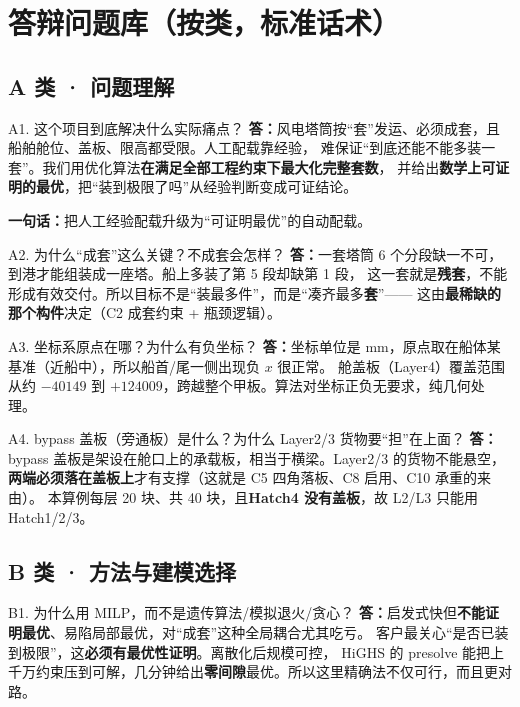 \documentclass[11pt]{ctexart}
\newcommand{\A}{\textbf{答：}}
\newcommand{\oneline}[1]{\begin{key}\textbf{一句话：}#1\end{key}}
\begin{document}
\section{答辩问题库（按类，标准话术）}

\subsection{A 类 · 问题理解}

\begin{qa}{A1. 这个项目到底解决什么实际痛点？}
\A 风电塔筒按“套”发运、必须成套，且船舶舱位、盖板、限高都受限。人工配载靠经验，
难保证“到底还能不能多装一套”。我们用优化算法\textbf{在满足全部工程约束下最大化完整套数}，
并给出\textbf{数学上可证明的最优}，把“装到极限了吗”从经验判断变成可证结论。
\oneline{把人工经验配载升级为“可证明最优”的自动配载。}
\end{qa}

\begin{qa}{A2. 为什么“成套”这么关键？不成套会怎样？}
\A 一套塔筒 6 个分段缺一不可，到港才能组装成一座塔。船上多装了第 5 段却缺第 1 段，
这一套就是\textbf{残套}，不能形成有效交付。所以目标不是“装最多件”，而是“凑齐最多\textbf{套}”——
这由\textbf{最稀缺的那个构件}决定（C2 成套约束 + 瓶颈逻辑）。
\end{qa}

\begin{qa}{A3. 坐标系原点在哪？为什么有负坐标？}
\A 坐标单位是 mm，原点取在船体某基准（近船中），所以船首/尾一侧出现负 $x$ 很正常。
舱盖板（Layer4）覆盖范围从约 $-40149$ 到 $+124009$，跨越整个甲板。算法对坐标正负无要求，纯几何处理。
\end{qa}

\begin{qa}{A4. bypass 盖板（旁通板）是什么？为什么 Layer2/3 货物要“担”在上面？}
\A bypass 盖板是架设在舱口上的承载板，相当于横梁。Layer2/3 的货物不能悬空，
\textbf{两端必须落在盖板上}才有支撑（这就是 C5 四角落板、C8 启用、C10 承重的来由）。
本算例每层 20 块、共 40 块，且\textbf{Hatch4 没有盖板}，故 L2/L3 只能用 Hatch1/2/3。
\end{qa}

\subsection{B 类 · 方法与建模选择}

\begin{qa}{B1. 为什么用 MILP，而不是遗传算法/模拟退火/贪心？}
\A 启发式快但\textbf{不能证明最优}、易陷局部最优，对“成套”这种全局耦合尤其吃亏。
客户最关心“是否已装到极限”，这\textbf{必须有最优性证明}。离散化后规模可控，
HiGHS 的 presolve 能把上千万约束压到可解，几分钟给出\textbf{零间隙}最优。所以这里精确法不仅可行，而且更对路。
\end{qa}
\end{document}
